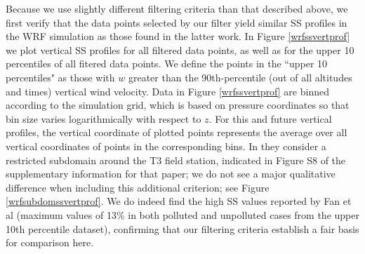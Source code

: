 \documentclass{article}
\begin{document}
Because we use slightly different filtering criteria than that described above, we first verify that the data points selected by our filter yield similar SS profiles in the WRF simulation as those found in the latter work. In Figure \ref{wrfssvertprof} we plot vertical SS profiles for all filtered data points, as well as for the upper 10 percentiles of all fitered data points. We define the points in the ``upper 10 percentiles" as those with $w$ greater than the 90th-percentile (out of all altitudes and times) vertical wind velocity. Data in Figure \ref{wrfssvertprof} are binned according to the simulation grid, which is based on pressure coordinates so that bin size varies logarithmically with respect to $z$. For this and future vertical profiles, the vertical coordinate of plotted points represents the average over all vertical coordinates of points in the corresponding bins. In \cite{Fan2018} they consider a restricted subdomain around the T3 field station, indicated in Figure S8 of the supplementary information for that paper; we do not see a major qualitative difference when including this additional criterion; see Figure \ref{wrfsubdomssvertprof}. We do indeed find the high SS values reported by Fan et al (maximum values of 13\% in both polluted and unpolluted cases from the upper 10th percentile dataset), confirming that our filtering criteria establish a fair basis for comparison here.
\end{document}
